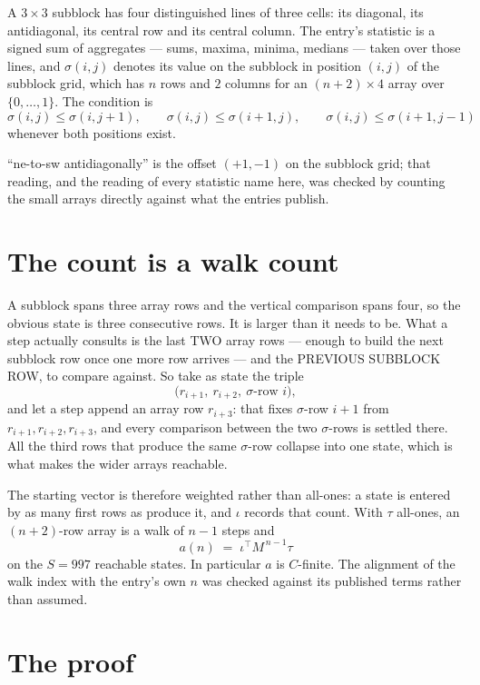 \documentclass[11pt,a4paper]{article}
\theoremstyle{plain}
\theoremstyle{definition}
\begin{document}
A $3\times3$ subblock has four distinguished lines of three cells: its diagonal, its
antidiagonal, its central row and its central column. The entry's statistic is a signed sum of
aggregates --- sums, maxima, minima, medians --- taken over those lines, and $\sigma(i,j)$
denotes its value on the subblock in position $(i,j)$ of the subblock grid, which has $n$ rows
and $2$ columns for an $(n+2)\times4$ array over $\{0,\dots,1\}$. The condition is
\[
\sigma(i,j)\le\sigma(i,j+1),\qquad \sigma(i,j)\le\sigma(i+1,j),\qquad \sigma(i,j)\le\sigma(i+1,j-1)
\]
whenever both positions exist.

``ne-to-sw antidiagonally'' is the offset $(+1,-1)$ on the subblock grid; that reading, and
the reading of every statistic name here, was checked by counting the small arrays directly
against what the entries publish.

\section{The count is a walk count}

A subblock spans three array rows and the vertical comparison spans four, so the obvious state
is three consecutive rows. It is larger than it needs to be. What a step actually consults is
the last TWO array rows --- enough to build the next subblock row once one more row arrives ---
and the PREVIOUS SUBBLOCK ROW, to compare against. So take as state the triple
\[
\bigl(r_{i+1},\ r_{i+2},\ \sigma\text{-row }i\bigr),
\]
and let a step append an array row $r_{i+3}$: that fixes $\sigma$-row $i+1$ from
$r_{i+1},r_{i+2},r_{i+3}$, and every comparison between the two $\sigma$-rows is settled
there. All the third rows that produce the same $\sigma$-row collapse into one state, which is
what makes the wider arrays reachable.

The starting vector is therefore weighted rather than all-ones: a state is entered by as many
first rows as produce it, and $\iota$ records that count. With $\tau$ all-ones, an
$(n+2)$-row array is a walk of $n-1$ steps and
\[
a(n)\;=\;\iota^{\!\top}M^{\,n-1}\tau
\]
on the $S=997$ reachable states. In particular $a$ is $C$-finite. The alignment of the walk
index with the entry's own $n$ was checked against its published terms rather than assumed.

\section{The proof}
\end{document}
